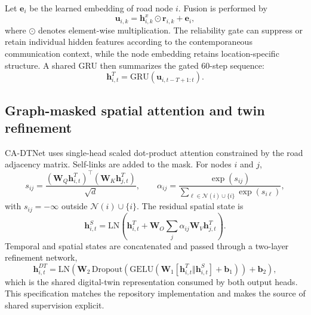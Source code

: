 \documentclass[pdflatex,sn-mathphys-num]{sn-jnl}%
\newenvironment{changed}{}{}
\theoremstyle{thmstyleone}%
\theoremstyle{thmstyletwo}%
\theoremstyle{thmstylethree}%
\begin{document}
\begin{changed}
Let \(\mathbf{e}_i\) be the learned embedding of road node \(i\). Fusion is performed by
\begin{equation}
\mathbf{u}_{i,k}=\mathbf{h}^{x}_{i,k}\odot\mathbf{r}_{i,k}+\mathbf{e}_{i},
\end{equation}
where \(\odot\) denotes element-wise multiplication. The reliability gate can suppress or retain individual hidden features according to the contemporaneous communication context, while the node embedding retains location-specific structure. A shared GRU then summarizes the gated 60-step sequence:
\begin{equation}
\mathbf{h}^{T}_{i,t}=\mathrm{GRU}\!\left(\mathbf{u}_{i,t-T+1:t}\right).
\end{equation}

\subsection{Graph-masked spatial attention and twin refinement}
\label{subsec:graph_attention_encoder}

CA-DTNet uses single-head scaled dot-product attention constrained by the road adjacency matrix. Self-links are added to the mask. For nodes \(i\) and \(j\),
\begin{equation}
s_{ij}=\frac{(\mathbf{W}_{Q}\mathbf{h}^{T}_{i,t})^{\top}(\mathbf{W}_{K}\mathbf{h}^{T}_{j,t})}{\sqrt{d}},
\qquad
\alpha_{ij}=\frac{\exp(s_{ij})}{\sum_{\ell\in\mathcal{N}(i)\cup\{i\}}\exp(s_{i\ell})},
\end{equation}
with \(s_{ij}=-\infty\) outside \(\mathcal{N}(i)\cup\{i\}\). The residual spatial state is
\begin{equation}
\mathbf{h}^{S}_{i,t}=\mathrm{LN}\!\left(\mathbf{h}^{T}_{i,t}+\mathbf{W}_{O}\sum_{j}\alpha_{ij}\mathbf{W}_{V}\mathbf{h}^{T}_{j,t}\right).
\end{equation}
Temporal and spatial states are concatenated and passed through a two-layer refinement network,
\begin{equation}
\mathbf{h}^{DT}_{i,t}=\mathrm{LN}\!\left(\mathbf{W}_{2}\,\mathrm{Dropout}\!\left(\mathrm{GELU}\!\left(\mathbf{W}_{1}[\mathbf{h}^{T}_{i,t}\Vert\mathbf{h}^{S}_{i,t}]+\mathbf{b}_{1}\right)\right)+\mathbf{b}_{2}\right),
\end{equation}
which is the shared digital-twin representation consumed by both output heads. This specification matches the repository implementation and makes the source of shared supervision explicit.
\end{changed}
\end{document}

